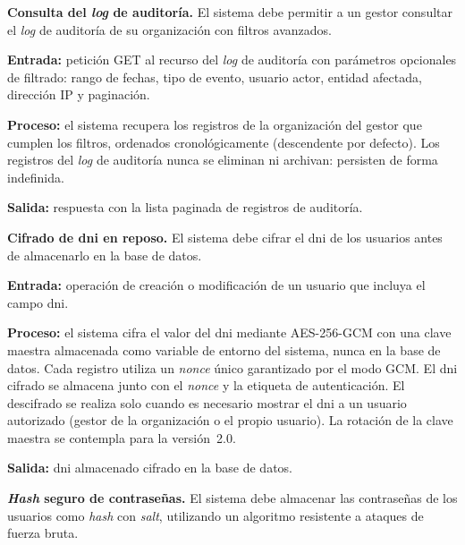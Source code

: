 \begin{functional}
    \item \textbf{Consulta del \textit{log} de auditoría.} \label{rf:sec:audit_query}
    El sistema debe permitir a un gestor consultar el \textit{log} de auditoría de su
    organización con filtros avanzados.

    \textbf{Entrada:} petición GET al recurso del \textit{log} de auditoría con parámetros
    opcionales de filtrado: rango de fechas, tipo de evento, usuario actor, entidad
    afectada, dirección IP y paginación.

    \textbf{Proceso:} el sistema recupera los registros de la organización del gestor que
    cumplen los filtros, ordenados cronológicamente (descendente por defecto). Los registros
    del \textit{log} de auditoría nunca se eliminan ni archivan: persisten de forma
    indefinida.

    \textbf{Salida:} respuesta con la lista paginada de registros de auditoría.

    \item \textbf{Cifrado de \acs{dni} en reposo.} \label{rf:sec:dni}
    El sistema debe cifrar el \acs{dni} de los usuarios antes de almacenarlo en la base de
    datos.

    \textbf{Entrada:} operación de creación o modificación de un usuario que incluya el
    campo \acs{dni}.

    \textbf{Proceso:} el sistema cifra el valor del \acs{dni} mediante AES-256-GCM con una
    clave maestra almacenada como variable de entorno del sistema, nunca en la base de
    datos. Cada registro utiliza un \textit{nonce} único garantizado por el modo GCM. El
    \acs{dni} cifrado se almacena junto con el \textit{nonce} y la etiqueta de
    autenticación. El descifrado se realiza solo cuando es necesario mostrar el \acs{dni} a
    un usuario autorizado (gestor de la organización o el propio usuario). La rotación de la
    clave maestra se contempla para la versión~2.0.

    \textbf{Salida:} \acs{dni} almacenado cifrado en la base de datos.

    \item \textbf{\textit{Hash} seguro de contraseñas.} \label{rf:sec:hash}
    El sistema debe almacenar las contraseñas de los usuarios como \textit{hash} con
    \textit{salt}, utilizando un algoritmo resistente a ataques de fuerza bruta.


\end{functional}
